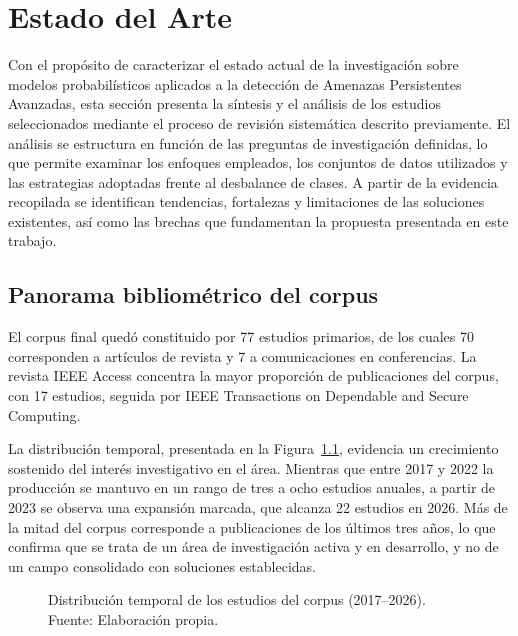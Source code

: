 \chapter{Estado del Arte}

Con el propósito de caracterizar el estado actual de la investigación sobre modelos probabilísticos aplicados a la detección de Amenazas Persistentes Avanzadas, esta sección presenta la síntesis y el análisis de los estudios seleccionados mediante el proceso de revisión sistemática descrito previamente. El análisis se estructura en función de las preguntas de investigación definidas, lo que permite examinar los enfoques empleados, los conjuntos de datos utilizados y las estrategias adoptadas frente al desbalance de clases. A partir de la evidencia recopilada se identifican tendencias, fortalezas y limitaciones de las soluciones existentes, así como las brechas que fundamentan la propuesta presentada en este trabajo.

\section{Panorama bibliométrico del corpus}

El corpus final quedó constituido por 77 estudios primarios, de los cuales 70 corresponden a artículos de revista y 7 a comunicaciones en conferencias. La revista IEEE Access concentra la mayor proporción de publicaciones del corpus, con 17 estudios, seguida por IEEE Transactions on Dependable and Secure Computing.

La distribución temporal, presentada en la Figura~\ref{fig:temporal}, evidencia un crecimiento sostenido del interés investigativo en el área. Mientras que entre 2017 y 2022 la producción se mantuvo en un rango de tres a ocho estudios anuales, a partir de 2023 se observa una expansión marcada, que alcanza 22 estudios en 2026. Más de la mitad del corpus corresponde a publicaciones de los últimos tres años, lo que confirma que se trata de un área de investigación activa y en desarrollo, y no de un campo consolidado con soluciones establecidas.

\begin{figure}[h!]
\centering
{}
\caption{Distribución temporal de los estudios del corpus (2017--2026). Fuente: Elaboración propia.}
\label{fig:temporal}
\end{figure}

